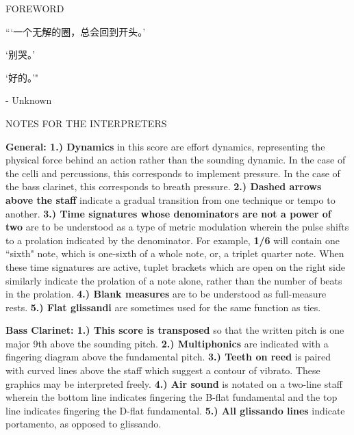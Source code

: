 \documentclass[12pt]{article}
\begin{document}
\begin{center}
\huge FOREWORD
\end{center}

\vspace*{2\baselineskip}

\begingroup
\begin{center}
{\setmainfont{Source Han Serif SC}\selectfont
“`一个无解的圈，总会回到开头。'

 

`别哭。'

 

`好的。'"
}
\rightskip\leftskip
\phantom{text} \hfill - Unknown
\end{center}
\endgroup

\begin{center}
\huge NOTES FOR THE INTERPRETERS
\end{center}

\vspace*{2\baselineskip}

\begingroup
\textbf{General: 1.) Dynamics} in this score are effort dynamics, representing the physical force behind an action rather than the sounding dynamic. In the case of the celli and percussions, this corresponds to implement pressure. In the case of the bass clarinet, this corresponds to breath pressure. \textbf{2.) Dashed arrows above the staff} indicate a gradual transition from one technique or tempo to another. \textbf{3.) Time signatures whose denominators are not a power of two} are to be understood as a type of metric modulation wherein the pulse shifts to a prolation indicated by the denominator. For example, \textbf{1/6} will contain one ``sixth" note, which is one-sixth of a whole note, or, a triplet quarter note. When these time signatures are active, tuplet brackets which are open on the right side similarly indicate the prolation of a note alone, rather than the number of beats in the prolation. \textbf{4.) Blank measures} are to be understood as full-measure rests. \textbf{5.) Flat glissandi} are sometimes used for the same function as ties. \\
\endgroup

\begingroup
\textbf{Bass Clarinet: 1.) This score is transposed} so that the written pitch is one major 9th above the sounding pitch. \textbf{2.) Multiphonics} are indicated with a fingering diagram above the fundamental pitch. \textbf{3.) Teeth on reed} is paired with curved lines above the staff which suggest a contour of vibrato. These graphics may be interpreted freely. \textbf{4.) Air sound} is notated on a two-line staff wherein the bottom line indicates fingering the B-flat fundamental and the top line indicates fingering the D-flat fundamental. \textbf{5.) All glissando lines} indicate portamento, as opposed to glissando. \\
\endgroup
\end{document}
